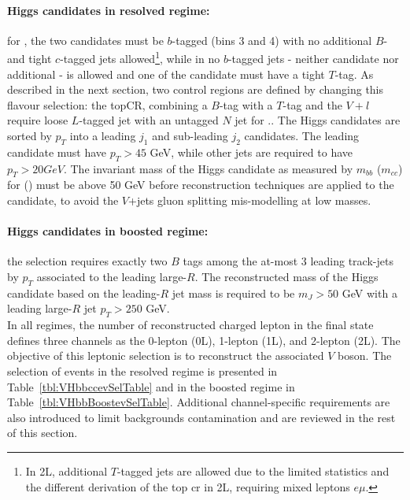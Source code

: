 \paragraph{Higgs candidates in resolved regime:} for \vhb, the two candidates must be $b$-tagged (bins 3 and 4) with no additional $B$- and tight $c$-tagged jets allowed\footnote{In 2L, additional $T$-tagged jets are allowed due to the limited statistics and the different derivation of the top \gls{cr} in 2L, requiring mixed leptons $e\mu$.}, while in \vhc no $b$-tagged jets - neither candidate nor additional - is allowed and one of the candidate must have a tight $T$-tag. As described in the next section, two control regions are defined by changing this flavour selection: the topCR, combining a $B$-tag with a $T$-tag and the $V+l$ require loose $L$-tagged jet with an untagged $N$ jet for \vhc.. The Higgs candidates are sorted by $p_T$ into a leading $j_1$ and sub-leading $j_2$ candidates. The leading candidate must have $p_T > 45$ GeV, while other jets are required to have $p_T > 20 GeV$. The invariant mass of the Higgs candidate as measured by $m_{bb}$ ($m_{cc}$) for \vhb (\vhc) must be above 50 GeV before reconstruction techniques are applied to the candidate, to avoid the $V$+jets gluon splitting mis-modelling at low masses.  \\ %
\paragraph{Higgs candidates in boosted regime:} the selection requires exactly two $B$ tags among the at-most 3 leading track-jets by $p_T$ associated to the leading large-$R$. The reconstructed mass of the Higgs candidate based on the leading-$R$ jet mass is required to be $m_J > 50$ GeV with a leading large-$R$ jet $p_T > 250$ GeV. \\

In all regimes, the number of reconstructed charged lepton in the final state defines three channels as the 0-lepton (0L), 1-lepton (1L), and 2-lepton (2L). The objective of this leptonic selection is to reconstruct the associated $V$ boson. The selection of events in the resolved regime is presented in Table~\ref{tbl:VHbbccevSelTable} and in the boosted regime in Table~\ref{tbl:VHbbBoostevSelTable}. Additional channel-specific requirements are also introduced to limit backgrounds contamination and are reviewed in the rest of this section.

